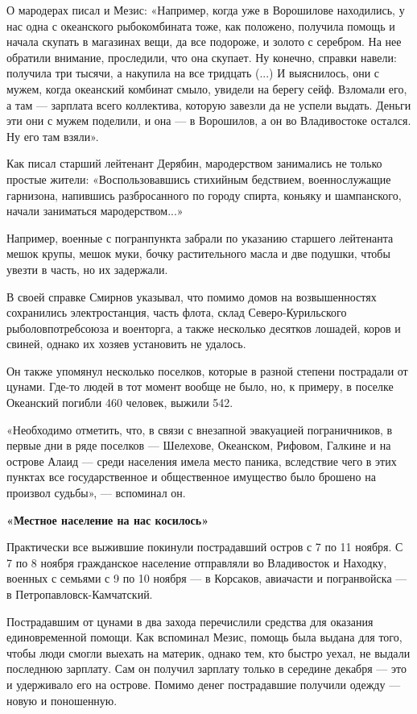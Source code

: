 О мародерах писал и Мезис: «Например, когда уже в Ворошилове находились, у нас одна с океанского рыбокомбината тоже, как положено, получила помощь и начала скупать в магазинах вещи, да все подороже, и золото с серебром. На нее обратили внимание, проследили, что она скупает. Ну конечно, справки навели: получила три тысячи, а накупила на все тридцать (...) И выяснилось, они с мужем, когда океанский комбинат смыло, увидели на берегу сейф. Взломали его, а там --- зарплата всего коллектива, которую завезли да не успели выдать. Деньги эти они с мужем поделили, и она --- в Ворошилов, а он во Владивостоке остался. Ну его там взяли».

Как писал старший лейтенант Дерябин, мародерством занимались не только простые жители: «Воспользовавшись стихийным бедствием, военнослужащие гарнизона, напившись разбросанного по городу спирта, коньяку и шампанского, начали заниматься мародерством...»

Например, военные с погранпункта забрали по указанию старшего лейтенанта мешок крупы, мешок муки, бочку растительного масла и две подушки, чтобы увезти в часть, но их задержали.

В своей справке Смирнов указывал, что помимо домов на возвышенностях сохранились электростанция, часть флота, склад Северо-Курильского рыболовпотребсоюза и военторга, а также несколько десятков лошадей, коров и свиней, однако их хозяев установить не удалось.

Он также упомянул несколько поселков, которые в разной степени пострадали от цунами. Где-то людей в тот момент вообще не было, но, к примеру, в поселке Океанский погибли 460 человек, выжили 542.

«Необходимо отметить, что, в связи с внезапной эвакуацией пограничников, в первые дни в ряде поселков --- Шелехове, Океанском, Рифовом, Галкине и на острове Алаид --- среди населения имела место паника, вследствие чего в этих пунктах все государственное и общественное имущество было брошено на произвол судьбы», --- вспоминал он.


\textbf{«Местное население на нас косилось»}

Практически все выжившие покинули пострадавший остров с 7 по 11 ноября. С 7 по 8 ноября гражданское население отправляли во Владивосток и Находку, военных с семьями с 9 по 10 ноября --- в Корсаков, авиачасти и погранвойска --- в Петропавловск-Камчатский.

Пострадавшим от цунами в два захода перечислили средства для оказания единовременной помощи. Как вспоминал Мезис, помощь была выдана для того, чтобы люди смогли выехать на материк, однако тем, кто быстро уехал, не выдали последнюю зарплату. Сам он получил зарплату только в середине декабря --- это и удерживало его на острове. Помимо денег пострадавшие получили одежду --- новую и поношенную.

